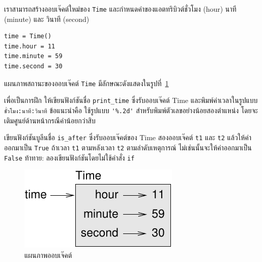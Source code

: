 เราสามารถสร้างออบเจ๊คต์ใหม่ของ {\tt Time} และกำหนดค่าของแอตทริบิวต์ชั่วโมง (hour) นาที (minute) และ วินาที (second)

\begin{verbatim}
time = Time()
time.hour = 11
time.minute = 59
time.second = 30
\end{verbatim}
%
แผนภาพสถานะของออบเจ๊คต์ {\tt Time} มีลักษณะดังแสดงในรูปที่~\ref{fig.time}


เพื่อเป็นการฝึก ให้เขียนฟังก์ชันชื่อ \verb|print_time| ซึ่งรับออบเจ๊คต์ Time 
และพิมพ์ค่าเวลาในรูปแบบ {\tt ชั่วโมง:นาที:วินาที}  
ข้อแนะนำคือ ใช้รูปแบบ \verb"'%.2d'" สำหรับพิมพ์ตัวเลขอย่างน้อยสองตำแหน่ง โดยจะเติมศูนย์ด้านหน้ากรณีค่าน้อยกว่าสิบ


เขียนฟังก์ชันบูลีนชื่อ \verb"is_after" ซึ่งรับออบเจ๊คต์ของ Time สองออบเจ๊คต์ {\tt t1} และ {\tt t2} 
แล้วให้ค่าออกมาเป็น {\tt True} ถ้าเวลา {\tt t1} ตามหลังเวลา {\tt t2} ตามลำดับเหตุการณ์ ไม่เช่นนั้นจะให้ค่าออกมาเป็น {\tt False}
ท้าทาย: ลองเขียนฟังก์ชันโดยไม่ใช้คำสั่ง {\tt if}

\begin{figure}
\centerline
{\includegraphics[scale=0.8]{figs/time.pdf}}
\caption{แผนภาพออบเจ๊คต์}
\label{fig.time}
\end{figure}


